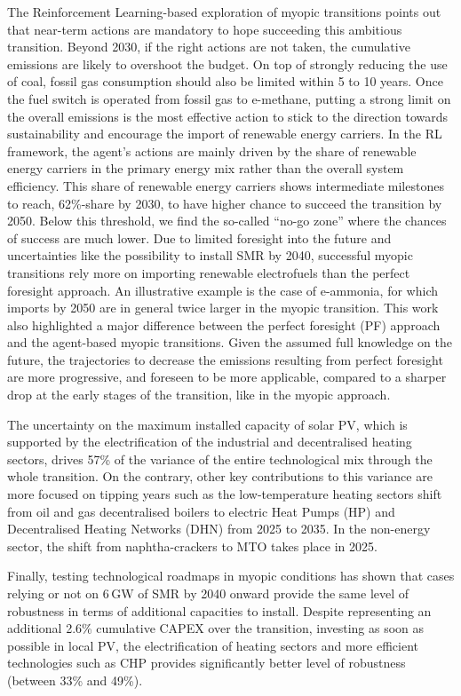 The Reinforcement Learning-based exploration of myopic transitions points out that near-term actions are mandatory to hope succeeding this ambitious transition.  Beyond 2030, if the right actions are not taken, the cumulative emissions are likely to overshoot the  budget. On top of strongly reducing the use of coal, fossil gas consumption should also be limited within 5 to 10 years. Once the fuel switch is operated from fossil gas to e-methane, putting a strong limit on the overall emissions is the most effective action to stick to the direction towards sustainability and encourage the import of renewable energy carriers. In the \gls{RL} framework, the agent's actions are mainly driven by the share of renewable energy carriers in the primary energy mix rather than the overall system efficiency. This share of renewable energy carriers shows intermediate milestones to reach, 62\%-share by 2030, to have higher chance to succeed the transition by 2050. Below this threshold, we find the so-called ``no-go zone'' where the chances of success are much lower. Due to limited foresight into the future and uncertainties like the possibility to install \gls{SMR} by 2040, successful myopic transitions rely more on importing renewable electrofuels than the perfect foresight approach. An illustrative example is the case of e-ammonia, for which imports by 2050 are in general twice larger in the myopic transition. This work also highlighted a major difference between the perfect foresight (PF) approach and the agent-based myopic transitions. Given the assumed full knowledge on the future, the trajectories to decrease the  emissions resulting from perfect foresight are more progressive, and foreseen to be more applicable, compared to a sharper drop at the early stages of the transition, like in the myopic approach.

The uncertainty on the maximum installed capacity of solar \gls{PV}, which is supported by the electrification of the industrial and decentralised heating sectors, drives 57\% of the variance of the entire technological mix through the whole transition. On the contrary, other key contributions to this variance are more focused on tipping years such as the low-temperature heating sectors shift from oil and gas decentralised boilers to electric Heat Pumps (HP) and Decentralised Heating Networks (DHN) from 2025 to 2035. In the non-energy sector, the shift from naphtha-crackers to \acrfull{MTO} takes place in 2025.

Finally, testing technological roadmaps in myopic conditions has shown that cases relying or not on 6\,GW of \gls{SMR} by 2040 onward provide the same level of robustness in terms of additional capacities to install. Despite representing an additional 2.6\% cumulative CAPEX over the transition, investing as soon as possible in local \gls{PV}, the electrification of heating sectors and more efficient technologies such as \gls{CHP} provides significantly better level of robustness (between 33\% and 49\%).\\



